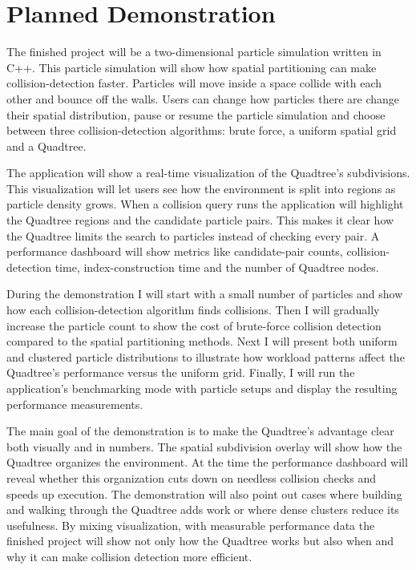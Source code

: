\section*{Planned Demonstration}

The finished project will be a two-dimensional particle simulation written in C++. This particle
simulation will show how spatial partitioning can make collision-detection faster. Particles will move
inside a space collide with each other and bounce off the walls. Users can change how particles there
are change their spatial distribution, pause or resume the particle simulation and choose between three
collision-detection algorithms: brute force, a uniform spatial grid and a Quadtree.

The application will show a real-time visualization of the Quadtree's subdivisions. This
visualization will let users see how the environment is split into regions as particle density grows. When
a collision query runs the application will highlight the Quadtree regions and the candidate particle
pairs. This makes it clear how the Quadtree limits the search to particles instead of checking every pair.
A performance dashboard will show metrics like candidate-pair counts, collision-detection time,
index-construction time and the number of Quadtree nodes.

During the demonstration I will start with a small number of particles and show how each
collision-detection algorithm finds collisions. Then I will gradually increase the particle count to show the
cost of brute-force collision detection compared to the spatial partitioning methods. Next I will present both
uniform and clustered particle distributions to illustrate how workload patterns affect the
Quadtree's performance versus the uniform grid. Finally, I will run the application's benchmarking mode
with particle setups and display the resulting performance measurements.

The main goal of the demonstration is to make the Quadtree's advantage clear both visually and
in numbers. The spatial subdivision overlay will show how the Quadtree organizes the environment. At
the time the performance dashboard will reveal whether this organization cuts down on needless
collision checks and speeds up execution. The demonstration will also point out cases where building
and walking through the Quadtree adds work or where dense clusters reduce its usefulness. By mixing
visualization, with measurable performance data the finished project will show not only how the
Quadtree works but also when and why it can make collision detection more efficient.
